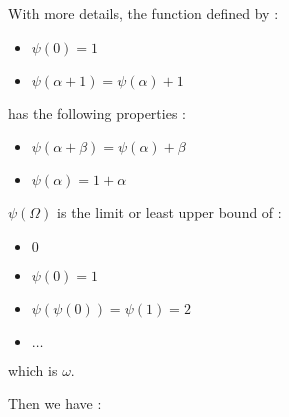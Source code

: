 \documentclass[10pt]{article}
\begin{document}
\bigskip

With more details, the function defined by :

\begin{itemize}
     \setlength{\itemsep}{1pt}
     \setlength{\parskip}{0pt}
     \setlength{\parsep}{0pt}
\item \( \psi(0) = 1 \)
\item \( \psi(\alpha+1) = \psi(\alpha)+1 \)
\end{itemize}

has the following properties :

\begin{itemize}
     \setlength{\itemsep}{1pt}
     \setlength{\parskip}{0pt}
     \setlength{\parsep}{0pt}
\item \( \psi(\alpha+\beta)=\psi(\alpha)+\beta \)
\item \( \psi(\alpha) = 1+\alpha \)
\end{itemize}

\( \psi(\Omega) \) is the limit or least upper bound of :

\begin{itemize}
     \setlength{\itemsep}{1pt}
     \setlength{\parskip}{0pt}
     \setlength{\parsep}{0pt}
\item \( 0 \)
\item \( \psi(0) = 1 \)
\item \( \psi(\psi(0)) = \psi(1) = 2 \)
\item \( \ldots \)
\end{itemize}

which is \( \omega \).

Then we have :
\end{document}
